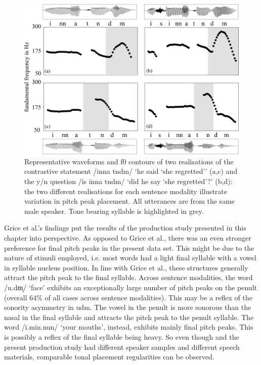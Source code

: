   \begin{figure}
  \centering 
   \includegraphics[width=.9\textwidth]{figures/Figure_5_10.png}
  \caption{Representative waveforms and f0 contours of two realisations of the contrastive statement /inna tndm/ ‘he said ‘she regretted’’ (a,c) and the y/n question /is inna tndm/ ‘did he say ‘she regretted’?’ (b,d): the two different realisations for each sentence modality illustrate variation in pitch peak placement. All utterances are from the same male speaker. Tone bearing syllable is highlighted in grey. }
   \label{fig:5.10}
   \end{figure}

  \clearpage  
Grice et al.’s findings put the results of the production study presented in this chapter into perspective. As opposed to Grice et al., there was an even stronger preference for final pitch peaks in the present data set. This might be due to the nature of stimuli employed, i.e. most words had a light final syllable with a vowel in syllable nucleus position. In line with Grice et al., these structures generally attract the pitch peak to the final syllable. Across sentence modalities, the word /u.dm̩/ ‘face’ exhibits an exceptionally large number of pitch peaks on the penult (overall 64\% of all cases across sentence modalities). This may be a reflex of the sonority asymmetry in udm. The vowel in the penult is more sonorous than the nasal in the final syllable and attracts the pitch peak to the penult syllable. The word /i.min.nun/ ‘your mouths’, instead, exhibits mainly final pitch peaks. This is possibly a reflex of the final syllable being heavy. So even though \citet{Grice.etal2015tash} and the present production study had different speaker samples and different speech materials, comparable tonal placement regularities can be observed. 

